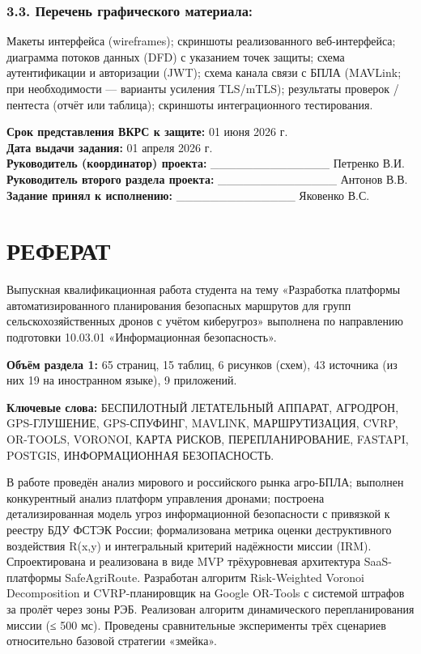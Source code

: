 \documentclass[14pt,a4paper]{extarticle}
\begin{document}
\hypertarget{ux43fux435ux440ux435ux447ux435ux43dux44c-ux433ux440ux430ux444ux438ux447ux435ux441ux43aux43eux433ux43e-ux43cux430ux442ux435ux440ux438ux430ux43bux430-1}{%
\subsubsection{3.3. Перечень графического материала:}\label{ux43fux435ux440ux435ux447ux435ux43dux44c-ux433ux440ux430ux444ux438ux447ux435ux441ux43aux43eux433ux43e-ux43cux430ux442ux435ux440ux438ux430ux43bux430-1}}

Макеты интерфейса (wireframes); скриншоты реализованного веб-интерфейса; диаграмма потоков данных (DFD) с указанием точек защиты; схема аутентификации и авторизации (JWT); схема канала связи с БПЛА (MAVLink; при необходимости --- варианты усиления TLS/mTLS); результаты проверок / пентеста (отчёт или таблица); скриншоты интеграционного тестирования.

\textbf{Срок представления ВКРС к защите:} 01 июня 2026 г.\\
\textbf{Дата выдачи задания:} 01 апреля 2026 г.\\
\textbf{Руководитель (координатор) проекта:} \_\_\_\_\_\_\_\_\_\_\_\_\_\_ Петренко В.И.\\
\textbf{Руководитель второго раздела проекта:} \_\_\_\_\_\_\_\_\_\_\_\_\_\_ Антонов В.В.\\
\textbf{Задание принял к исполнению:} \_\_\_\_\_\_\_\_\_\_\_\_\_\_ Яковенко В.С.


\clearpage
\hypertarget{ux440ux435ux444ux435ux440ux430ux442}{%
\section{РЕФЕРАТ}\label{ux440ux435ux444ux435ux440ux430ux442}}

Выпускная квалификационная работа студента на тему «Разработка платформы автоматизированного планирования безопасных маршрутов для групп сельскохозяйственных дронов с учётом киберугроз» выполнена по направлению подготовки 10.03.01 «Информационная безопасность».

\textbf{Объём раздела 1:} 65 страниц, 15 таблиц, 6 рисунков (схем), 43 источника (из них 19 на иностранном языке), 9 приложений.

\textbf{Ключевые слова:} БЕСПИЛОТНЫЙ ЛЕТАТЕЛЬНЫЙ АППАРАТ, АГРОДРОН, GPS-ГЛУШЕНИЕ, GPS-СПУФИНГ, MAVLINK, МАРШРУТИЗАЦИЯ, CVRP, OR-TOOLS, VORONOI, КАРТА РИСКОВ, ПЕРЕПЛАНИРОВАНИЕ, FASTAPI, POSTGIS, ИНФОРМАЦИОННАЯ БЕЗОПАСНОСТЬ.

В работе проведён анализ мирового и российского рынка агро-БПЛА; выполнен конкурентный анализ платформ управления дронами; построена детализированная модель угроз информационной безопасности с привязкой к реестру БДУ ФСТЭК России; формализована метрика оценки деструктивного воздействия R(x,y) и интегральный критерий надёжности миссии (IRM). Спроектирована и реализована в виде MVP трёхуровневая архитектура SaaS-платформы SafeAgriRoute. Разработан алгоритм Risk-Weighted Voronoi Decomposition и CVRP-планировщик на Google OR-Tools с системой штрафов за пролёт через зоны РЭБ. Реализован алгоритм динамического перепланирования миссии (≤ 500 мс). Проведены сравнительные эксперименты трёх сценариев относительно базовой стратегии «змейка».
\end{document}
